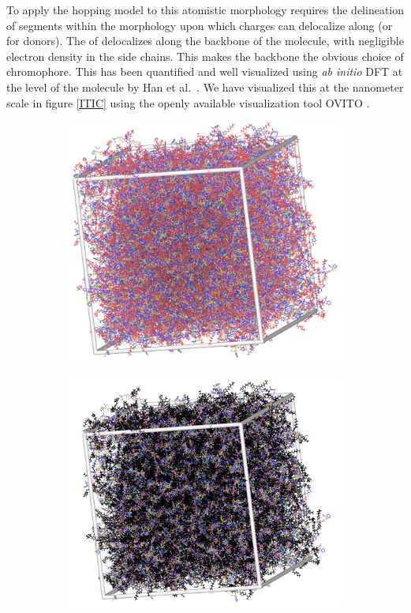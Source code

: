 To apply the hopping model to this atomistic morphology requires the
delineation of segments within the morphology upon which charges can delocalize along  (or 
 for donors).   
The  of  delocalizes along the backbone of the molecule, with
negligible electron density in the side chains. This makes the backbone the obvious choice of chromophore.
This has been quantified and well visualized using \textit{ab
initio} DFT at the level of the molecule by Han et al.~\cite{Han2019}.
We have visualized this at the nanometer scale in figure \ref{ITIC} using the openly
available visualization tool OVITO \cite{Stukowski2010a}. 
\begin{figure}
\centering
\begin{subfigure}{.5\textwidth}
    \includegraphics[width=\textwidth]{figures/ITIC-blackedout-unwrapped-allatom.png}
\end{subfigure}%
\begin{subfigure}{.5\textwidth}
    \includegraphics[width=\textwidth]{figures/ITIC-blackedout-unwrapped.png}

\end{subfigure}
\end{figure}
